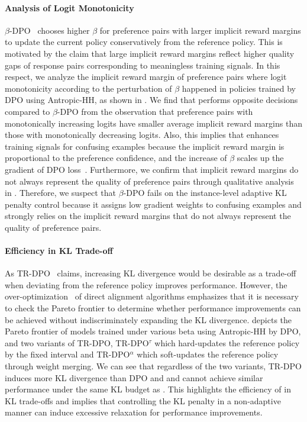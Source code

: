 

\paragraph{Analysis of Logit Monotonicity}
$\beta$-DPO~\cite{wu2024beta} chooses higher $\beta$ for preference pairs with larger implicit reward margins to update the current policy conservatively from the reference policy. This is motivated by the claim that large implicit reward margins reflect higher quality gaps of response pairs corresponding to meaningless training signals. In this respect, we analyze the implicit reward margin of preference pairs where logit monotonicity according to the perturbation of $\beta$ happened in policies trained by DPO using Antropic-HH, as shown in . We find that \method{} performs opposite decisions compared to $\beta$-DPO from the observation that preference pairs with monotonically increasing logits have smaller average implicit reward margins than those with monotonically decreasing logits. Also, this implies that \method{} enhances training signals for confusing examples because the implicit reward margin is proportional to the preference confidence, and the increase of $\beta$ scales up the gradient of DPO loss~\cite{rafailov2023direct}. Furthermore, we confirm that implicit reward margins do not always represent the quality of preference pairs through qualitative analysis in . Therefore, we suspect that $\beta$-DPO fails on the instance-level adaptive KL penalty control because it assigns low gradient weights to confusing examples and strongly relies on the implicit reward margins that do not always represent the quality of preference pairs.

\paragraph{Efficiency in KL Trade-off}
As TR-DPO~\cite{gorbatovski2024learn} claims, increasing KL divergence would be desirable as a trade-off when deviating from the reference policy improves performance. However, the over-optimization~\cite{rafailov2024scaling} of direct alignment algorithms emphasizes that it is necessary to check the Pareto frontier to determine whether performance improvements can be achieved without indiscriminately expanding the KL divergence.  depicts the Pareto frontier of models trained under various beta using Antropic-HH by DPO, \method{} and two variants of TR-DPO, TR-DPO$^\tau$ which hard-updates the reference policy by the fixed interval and TR-DPO$^\alpha$ which soft-updates the reference policy through weight merging. We can see that regardless of the two variants, TR-DPO induces more KL divergence than DPO and \method{} and cannot achieve similar performance under the same KL budget as \method{}. This highlights the efficiency of \method{} in KL trade-offs and implies that controlling the KL penalty in a non-adaptive manner can induce excessive relaxation for performance improvements.